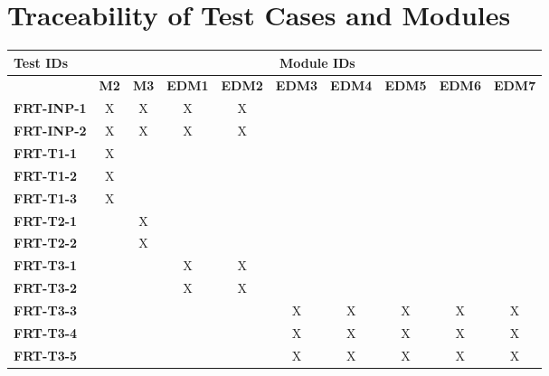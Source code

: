\documentclass[12pt, titlepage]{article}
\begin{document}
\section{Traceability of Test Cases and Modules}
\begin{longtable}{|l|ccccccccc|}
   \hline
   \textbf{Test IDs}  & \multicolumn{9}{c|}{\textbf{Module IDs}}                                               \\
   \hline
   ~                  & \textbf{M2}                              & \textbf{M3} & \textbf{EDM1} & \textbf{EDM2} & \textbf{EDM3} & \textbf{EDM4} & \textbf{EDM5} & \textbf{EDM6} & \textbf{EDM7} \\
   \hline
   \textbf{FRT-INP-1}  & X                                        & X           & X             & X             & ~ & ~ & ~ & ~ & ~\\
   \textbf{FRT-INP-2}  & X                                        & X           & X             & X             & ~ & ~ & ~ & ~ & ~\\
   \textbf{FRT-T1-1}  & X                                        & ~           & ~             & ~             & ~ & ~ & ~ & ~ & ~\\
   \textbf{FRT-T1-2}  & X                                        & ~           & ~             & ~             & ~ & ~ & ~ & ~ & ~\\
   \textbf{FRT-T1-3}  & X                                        & ~           & ~             & ~             & ~ & ~ & ~ & ~ & ~\\
   \textbf{FRT-T2-1}  & ~                                        & X           & ~             & ~             & ~ & ~ & ~ & ~ & ~\\
   \textbf{FRT-T2-2}  & ~                                        & X           & ~             & ~             & ~ & ~ & ~ & ~ & ~\\
   \textbf{FRT-T3-1}  & ~                                        & ~           & X             & X             & ~ & ~ & ~ & ~ & ~\\
   \textbf{FRT-T3-2}  & ~                                        & ~           & X             & X             & ~ & ~ & ~ & ~ & ~\\
   \textbf{FRT-T3-3}  & ~                                        & ~           & ~             & ~             & X & X & X & X & X\\
   \textbf{FRT-T3-4}  & ~                                        & ~           & ~             & ~             & X & X & X & X & X\\
   \textbf{FRT-T3-5}  & ~                                        & ~           & ~             & ~             & X & X & X & X & X\\
   \hline
\end{longtable}
\end{document}
